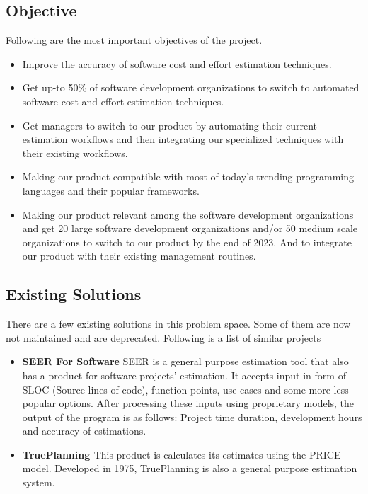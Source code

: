 \subsection{Objective}
Following are the most important objectives of the project.
\begin{itemize}
	\item Improve the accuracy of software cost and effort estimation techniques.
	\item Get up-to 50\% of software development organizations to switch to automated software cost and effort estimation techniques.
	\item Get managers to switch to our product by automating their current estimation workflows and then  integrating our specialized techniques with their existing workflows.
	\item Making our product compatible with most of today's trending programming languages and their popular frameworks.
	\item Making our product relevant among the software development organizations and get 20 large software development organizations and/or 50 medium scale organizations to switch to our product by the end of 2023. And to integrate our product with their existing management routines.
\end{itemize}













\subsection{Existing Solutions}
There are a few existing solutions in this problem space. Some of them are now not maintained and are deprecated. Following is a list of similar projects
\begin{itemize}
	\item {\bf{SEER For Software}}\newline
	SEER is a general purpose estimation tool that also has a product for software projects' estimation. It accepts input in form of SLOC (Source lines of code), function points, use cases and some more less popular options. After processing these inputs using proprietary models, the output of the program is as follows: Project time duration, development hours and accuracy of estimations.

	\item {\bf{TruePlanning \small{\textregistered}}}\newline
	This product is calculates its estimates using the PRICE model. Developed in 1975, TruePlanning is also a general purpose estimation system.
	
\end{itemize}













